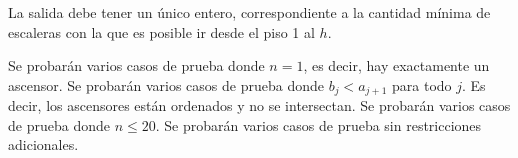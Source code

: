 \documentclass{oci}
\begin{document}
\begin{outputDescription}
  La salida debe tener un único entero, correspondiente a la
  cantidad mínima de escaleras con la que es posible ir desde
  el piso 1 al $h$.
\end{outputDescription}

\newpage
\begin{scoreDescription}
   Se probarán varios casos de prueba donde $n = 1$, es decir, hay exactamente un
  ascensor.
   Se probarán varios casos de prueba donde $b_j < a_{j+1}$ para todo $j$.
  Es decir, los ascensores están ordenados y no se intersectan.
   Se probarán varios casos de prueba donde $n \leq 20$.
   Se probarán varios casos de prueba sin restricciones adicionales.
\end{scoreDescription}

\begin{sampleDescription}
\end{sampleDescription}
\end{document}
